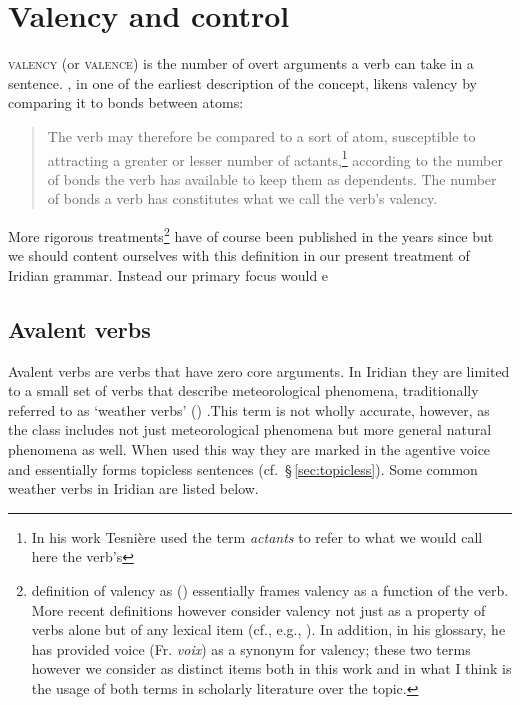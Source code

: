 \section{Valency and control}

{\scshape valency} (or {\scshape valence}) is the number of overt
arguments a verb can take in a sentence.
\textcite[239]{tesniere1965}, in one of the earliest description of the concept,
likens valency by comparing it to bonds between atoms:
\begin{quotation}
	\small
The verb may therefore be compared to a sort of atom, susceptible to attracting
a greater or lesser number of actants,\footnote{In his work Tesnière used the
term \emph{actants} to refer to what we would call here the verb's
} according to the number of bonds the verb has available to
keep them as dependents. The number of bonds a verb has constitutes what we call
the verb's valency.
\end{quotation}

More rigorous treatments\footnote{ definition of valency
as 
()
essentially frames valency as a function of the verb. More recent definitions
however consider valency not just as a property of verbs alone but of any
lexical item (cf., e.g., \cite{matthews1997,trask1993}). In addition, in his
glossary, he has provided voice (Fr. \emph{voix}) as a synonym for valency;
these two terms however we consider as distinct items both in this work and in
what I think is the usage of both terms in scholarly literature over the topic.}
have of course been published in the years since but we should content ourselves
with this definition in our present treatment of Iridian grammar. Instead our
primary focus would e

\subsection{Avalent verbs}

Avalent verbs  are verbs that have zero core arguments. In
Iridian they are limited to a small set of verbs that describe meteorological
phenomena, traditionally referred to as `weather verbs' ()
.This term is not wholly accurate, however, as the class
includes not just meteorological phenomena but more general natural phenomena as
well. When used this way they are marked in the agentive voice and essentially forms topicless sentences
(cf.~\S\,\ref{sec:topicless}). Some common weather verbs in Iridian are listed
below.

